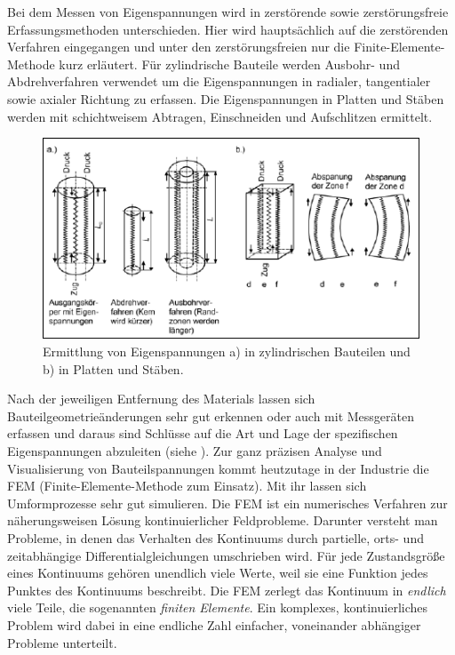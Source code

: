 \documentclass[12pt,a4paper,parskip,twoside,BCOR5mm,headsepline]{scrartcl}
\begin{document}
\begin{description*}
\begin{itemize*}
Bei dem Messen von Eigenspannungen wird in zerstörende sowie zerstörungsfreie Erfassungsmethoden unterschieden. Hier wird hauptsächlich auf die zerstörenden Verfahren eingegangen und unter den zerstörungsfreien nur die Finite-Elemente-Methode kurz erläutert. Für zylindrische Bauteile werden Ausbohr- und Abdrehverfahren verwendet um die Eigenspannungen in radialer, tangentialer sowie axialer Richtung zu erfassen. Die Eigenspannungen in Platten und Stäben werden mit schichtweisem Abtragen, Einschneiden und Aufschlitzen ermittelt.\begin{figure}
  \centering
  \includegraphics[width=.8\textwidth]{eigenspanschnitt}
  \caption[Ermittlung von Eigenspannungen]{Ermittlung von Eigenspannungen a) in zylindrischen Bauteilen und b) in Platten und Stäben. \autocite[36]{hu}}
  \label{fig:eigenspanschnitt}
  \end{figure}

  Nach der jeweiligen Entfernung des Materials lassen sich Bauteilgeometrieänderungen sehr gut erkennen oder auch mit Messgeräten erfassen und daraus  sind Schlüsse auf die Art und Lage der spezifischen Eigenspannungen abzuleiten (siehe ). Zur ganz präzisen Analyse  und Visualisierung von Bauteilspannungen kommt heutzutage in der Industrie  die FEM (Finite-Elemente-Methode zum Einsatz). \autocite[32-37]{hu} Mit ihr lassen sich Umformprozesse sehr gut simulieren. Die FEM ist ein numerisches Verfahren zur näherungsweisen Lösung kontinuierlicher Feldprobleme. Darunter versteht man Probleme, in denen das Verhalten des Kontinuums durch partielle, orts- und zeitabhängige Differentialgleichungen umschrieben wird. Für jede Zustandsgröße eines Kontinuums gehören unendlich viele Werte, weil sie eine Funktion jedes Punktes des Kontinuums beschreibt. Die FEM zerlegt das Kontinuum in \emph{endlich} viele Teile, die sogenannten \emph{finiten Elemente}. Ein komplexes, kontinuierliches Problem wird dabei in eine endliche Zahl einfacher, voneinander abhängiger Probleme unterteilt. \autocite[48]{fu}

\end{itemize*}
\end{description*}
\end{document}
